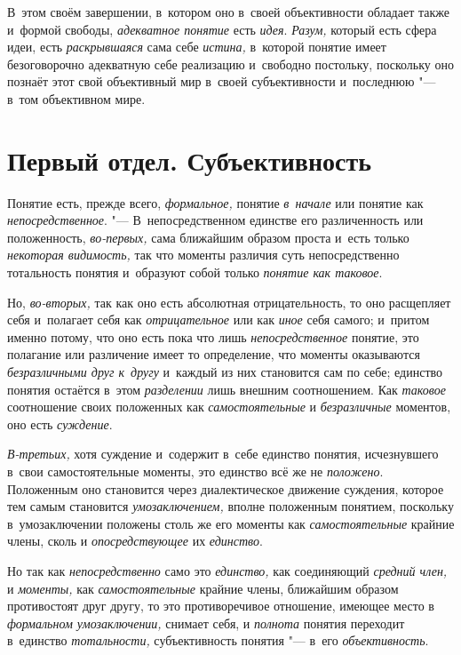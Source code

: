 В~этом своём завершении, в~котором оно в~своей объективности
обладает также и~формой свободы, {\em адекватное понятие} есть
{\em идея}. {\em Разум,} который есть сфера идеи, есть {\em раскрывшаяся}
сама себе {\em истина,} в~которой понятие имеет безоговорочно адекватную себе
реализацию и~свободно постольку, поскольку оно познаёт этот свой
объективный мир в~своей субъективности и~последнюю "--- в~том объективном мире.

\part[Первый отдел\\ СУБЪЕКТИВНОСТЬ]{Первый отдел. Субъективность}

Понятие есть, прежде всего, {\em формальное,} понятие {\em в~начале} или
понятие как {\em непосредственное}. "---
В~непосредственном единстве его различенность или
положенность, {\em во-первых,} сама ближайшим образом проста и~есть только
{\em некоторая видимость,} так что моменты различия суть непосредственно
тотальность понятия и~образуют собой только {\em понятие как таковое}.

Но, {\em во-вторых,} так как оно есть абсолютная отрицательность, то оно
расщепляет себя и~полагает себя как {\em отрицательное} или
как {\em иное} себя самого; и~притом именно потому, что оно есть пока что лишь
{\em непосредственное} понятие, это полагание или различение имеет то
определение, что моменты оказываются {\em безразличными друг к~другу}
и~каждый из них становится сам по себе; единство понятия
остаётся в~этом {\em разделении} лишь внешним соотношением. Как
{\em таковое} соотношение своих положенных как {\em самостоятельные} и
{\em безразличные} моментов, оно есть {\em суждение}.

{\em В-третьих,} хотя
суждение и~содержит в~себе единство понятия, исчезнувшего в~свои
самостоятельные моменты, это единство всё же не {\em положено}.
Положенным оно становится через диалектическое движение
суждения, которое тем самым становится {\em умозаключением,}
вполне положенным понятием, поскольку в~умозаключении
положены столь же его моменты как {\em самостоятельные}
крайние члены, сколь и {\em опосредствующее} их {\em единство}.

Но так как {\em непосредственно} само это {\em единство,} как соединяющий
{\em средний член,} и {\em моменты,} как {\em самостоятельные}
крайние члены, ближайшим образом противостоят друг другу, то
это противоречивое отношение, имеющее место в
{\em формальном умозаключении,} снимает себя, и {\em полнота} понятия
переходит в~единство {\em тотальности,}
субъективность понятия "--- в~его {\em объективность}.

